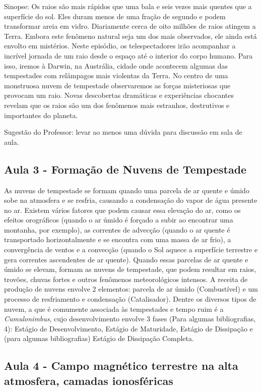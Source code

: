\documentclass[a4paper, 12pt, onecolumn,singlespacing]{article}
\begin{document}
	Sinopse: Os raios são mais rápidos que uma bala e seis vezes mais quentes que a superfície do sol. Eles duram menos de uma fração de segundo e podem transformar areia em vidro. Diariamente cerca de oito milhões de raios atingem a Terra. Embora este fenômeno natural seja um dos mais observados, ele ainda está envolto em mistérios. Neste episódio, os telespectadores irão acompanhar a incrível jornada de um raio desde o espaço até o interior do corpo humano. Para isso, iremos à Darwin, na Austrália, cidade onde acontecem algumas das tempestades com relâmpagos mais violentas da Terra. No centro de uma monstruosa nuvem de tempestade observaremos as forças misteriosas que provocam um raio. Novas descobertas dramáticas e experiências chocantes revelam que os raios são um dos fenômenos mais estranhos, destrutivos e importantes do planeta.
	
	Sugestão do Professor: levar ao menos uma dúvida para discussão em sala de aula.
	
	\subsection{Aula 3 - Formação de Nuvens de Tempestade}
	
	As nuvens de tempestade se formam quando uma parcela de ar quente e úmido sobe na atmosfera e se resfria, causando a condensação do vapor de água presente no ar. Existem vários fatores que podem causar essa elevação do ar, como os efeitos orográficos (quando o ar úmido é forçado a subir ao encontrar uma montanha, por exemplo), as correntes de advecção (quando o ar quente é transportado horizontalmente e se encontra com uma massa de ar frio), a convergência de ventos e a convecção (quando o Sol aquece a superfície terrestre e gera correntes ascendentes de ar quente). Quando essas parcelas de ar quente e úmido se elevam, formam as nuvens de tempestade, que podem resultar em raios, trovões, chuvas fortes e outros fenômenos meteorológicos intensos. A receita de produção de nuvens envolve 2 elementos: parcela de ar úmido (Combustível) e um processo de resfriamento e condensação (Catalisador). Dentre os diversos tipos de nuvem, a que é comumente associada às tempestades e tempo ruim é a \textit{Cumulonimbus}, cujo desenvolvimento envolve 3 fases (Para algumas bibliografias, 4): Estágio de Desenvolvimento, Estágio de Maturidade, Estágio de Dissipação e (para algumas bibliografias) Estágio de Dissipação Completa.
	
	\subsection{Aula 4 - Campo magnético terrestre na alta atmosfera, camadas ionosféricas}
	
\end{document}
